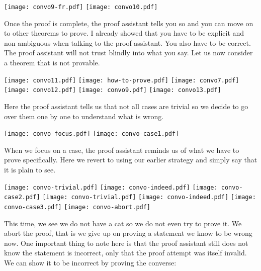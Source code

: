 \begin{center}
  \texttt{[image: convo9-fr.pdf]}
  \texttt{[image: convo10.pdf]}
\end{center}

Once the proof is complete, the proof assistant tells you so and you can move on
to other theorems to prove. I already showed that you have to be explicit and
non ambiguous when talking to the proof assistant. You also have to be correct.
The proof assistant will not trust blindly into what you say.
%
Let us now consider a theorem that is not provable.

\begin{center}
  \texttt{[image: convo11.pdf]}
  \texttt{[image: how-to-prove.pdf]}
  \texttt{[image: convo7.pdf]}
  \texttt{[image: convo12.pdf]}
  \texttt{[image: convo9.pdf]}
  \texttt{[image: convo13.pdf]}
\end{center}

Here the proof assistant tells us that not all cases are trivial so we decide
to go over them one by one to understand what is wrong.

\begin{center}
  \texttt{[image: convo-focus.pdf]}
  \texttt{[image: convo-case1.pdf]}
\end{center}

When we focus on a case, the proof assistant reminds us of what we have to prove
specifically. Here we revert to using our earlier strategy and simply say that
it is plain to see.

\begin{center}
  \texttt{[image: convo-trivial.pdf]}
  \texttt{[image: convo-indeed.pdf]}
  \texttt{[image: convo-case2.pdf]}
  \texttt{[image: convo-trivial.pdf]}
  \texttt{[image: convo-indeed.pdf]}
  \texttt{[image: convo-case3.pdf]}
  \texttt{[image: convo-abort.pdf]}
\end{center}

This time, we see we do not have a cat so we do not even try to prove it.
We abort the proof, that is we give up on proving a statement we know to be
wrong now.
One important thing to note here is that the proof assistant still does not
know the statement is incorrect, only that the proof attempt was itself invalid.
We can show it to be incorrect by proving the converse:


